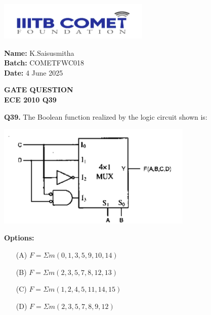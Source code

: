\documentclass{article}
\begin{document}
\begin{minipage}{0.6\textwidth}
    \includegraphics[height=1.8cm]{img3.png}
\end{minipage}
\hfill
\begin{minipage}{0.35\textwidth}
\raggedleft
\textbf{Name:} K.Saisusmitha \\
\textbf{Batch:} COMETFWC018 \\
\textbf{Date:} 4 June 2025
\end{minipage}

\begin{center}
    {\color{cyan} \LARGE \textbf{GATE QUESTION}}\\
    {\color{cyan} \Large \textbf{ECE 2010 Q39}}
\end{center}
\vspace{1em}
\noindent\textbf{\color{cyan} Q39.} The Boolean function realized by the logic circuit shown is:

\vspace{1em}

\begin{center}
    \includegraphics[width=0.7\textwidth]{esp 32.png} 
\end{center}

\vspace{1em}

\noindent\textbf{Options:}

\vspace{0.5em}
\begin{multicols}{2}
\begin{itemize}
    \item[(A)] \(F = \Sigma m(0,1,3,5,9,10,14)\)
    \item[(B)] \(F = \Sigma m(2,3,5,7,8,12,13)\)
    \item[(C)] \(F = \Sigma m(1,2,4,5,11,14,15)\)
    \item[(D)] \(F = \Sigma m(2,3,5,7,8,9,12)\)
\end{itemize}
\end{multicols}
\end{document}
